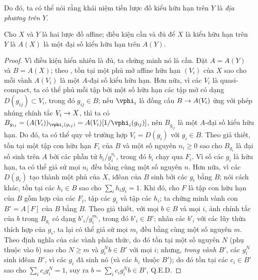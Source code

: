 \documentclass[oneside]{amsart}
\makeatletter
\renewcommand{\geq}{\geqslant}
\newcommand{\ega@arrow}[2]{\mathchoice{#1}{#2}{#2}{#2}}
\renewcommand{\to}{\ega@arrow{\longrightarrow}{\rightarrow}}
\newcommand{\oldpage}[2][]{{\marginnote{\normalfont\textbf{#1}~|~#2}}\ignorespaces}
\let\EGAOriginalLabel\label
\renewcommand{\label}[1]{\phantomsection\EGAOriginalLabel{#1}}
\makeatother
\begin{document}
\oldpage[I]{145}
Do đó, ta có thể nói rằng khái niệm tiền lược đồ kiểu hữu hạn trên $Y$ là \emph{địa phương trên $Y$}.

\begin{proposition}[6.3.3]
\label{I.6.3.3}
Cho $X$ và $Y$ là hai lược đồ affine;
điều kiện cần và đủ để $X$ là kiểu hữu hạn trên $Y$ là $A(X)$ là một đại số kiểu hữu hạn trên $A(Y)$.
\end{proposition}

\begin{proof}
Vì điều kiện hiển nhiên là đủ, ta chứng minh nó là cần.
Đặt $A=A(Y)$ và $B=A(X)$;
theo , tồn tại một phủ mở affine hữu hạn $(V_i)$ của $X$ sao cho mỗi vành $A(V_i)$ là một $A$-đại số kiểu hữu hạn.
Hơn nữa, vì các $V_i$ là quasi-compact, ta có thể phủ mỗi tập bởi một số hữu hạn các tập mở có dạng $D(g_{ij})\subset V_i$, trong đó $g_{ij}\in B$;
nếu $\vphi_i$ là đồng cấu $B\to A(V_i)$ ứng với phép nhúng chính tắc $V_i\to X$, thì ta có $B_{g_{ij}}=(A(V_i))_{\vphi_i(g_{ij})}=A(V_i)[1/\vphi_i(g_{ij})]$, nên $B_{g_{ij}}$ là một $A$-đại số kiểu hữu hạn.
Do đó, ta có thể quy về trường hợp $V_i=D(g_i)$ với $g_i\in B$.
Theo giả thiết, tồn tại một tập con hữu hạn $F_i$ của $B$ và một số nguyên $n_i\geq0$ sao cho $B_{g_i}$ là đại số sinh trên $A$ bởi các phần tử $b_i/g_i^{n_i}$, trong đó $b_i$ chạy qua $F_i$.
Vì số các $g_i$ là hữu hạn, ta có thể giả sử mọi $n_i$ đều bằng cùng một số nguyên $n$.
Hơn nữa, vì các $D(g_i)$ tạo thành một phủ của $X$, iđêan của $B$ sinh bởi các $g_i$ bằng $B$; nói cách khác, tồn tại các $h_i\in B$ sao cho $\sum_i h_ig_i=1$.
Khi đó, cho $F$ là tập con hữu hạn của $B$ gồm hợp của các $F_i$, tập các $g_i$ và tập các $h_i$; ta chứng minh vành con $B'=A[F]$ của $B$ bằng $B$.
Theo giả thiết, với mọi $b\in B$ và mọi $i$, ảnh chính tắc của $b$ trong $B_{g_i}$ có dạng $b'_i/g_i^{m_i}$, trong đó $b'_i\in B'$;
nhân các $b'_i$ với các lũy thừa thích hợp của $g_i$, ta lại có thể giả sử mọi $m_i$ đều bằng cùng một số nguyên $m$.
Theo định nghĩa của các vành phân thức, do đó tồn tại một số nguyên $N$ (phụ thuộc vào $b$) sao cho $N\geq m$ và $g_i^Nb\in B'$ với mọi $i$;
nhưng, \emph{trong vành $B'$}, các $g_i^N$ sinh iđêan $B'$, vì các $g_i$ đã sinh nó (và các $h_i$ thuộc $B'$);
do đó tồn tại các $c_i\in B'$ sao cho $\sum_i c_ig_i^N=1$, suy ra $b=\sum_ic_ig_i^Nb\in B'$, Q.E.D.
\end{proof}
\end{document}
